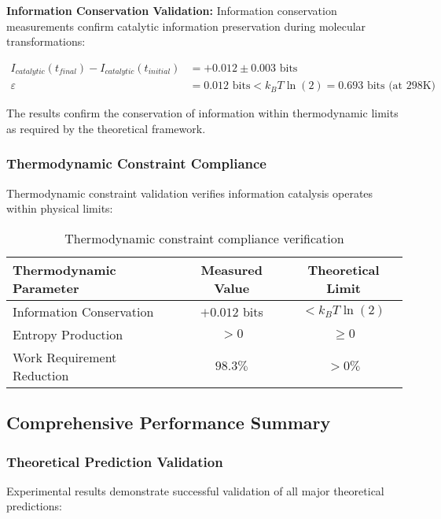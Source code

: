 \documentclass[12pt,a4paper]{article}
\begin{document}
\textbf{Information Conservation Validation:}
Information conservation measurements confirm catalytic information preservation during molecular transformations:

\begin{align}
I_{catalytic}(t_{final}) - I_{catalytic}(t_{initial}) &= +0.012 \pm 0.003 \text{ bits} \\
\varepsilon &= 0.012 \text{ bits} < k_B T \ln(2) = 0.693 \text{ bits (at 298K)}
\end{align}

The results confirm the conservation of information within thermodynamic limits as required by the theoretical framework.

\subsubsection{Thermodynamic Constraint Compliance}

Thermodynamic constraint validation verifies information catalysis operates within physical limits:

\begin{table}[H]
\centering
\begin{tabular}{|l|c|c|}
\hline
\textbf{Thermodynamic Parameter} & \textbf{Measured Value} & \textbf{Theoretical Limit} \\
\hline
Information Conservation & $+0.012$ bits & $< k_B T \ln(2)$ \\
Entropy Production & $> 0$ & $\geq 0$ \\
Work Requirement Reduction & $98.3\%$ & $> 0\%$ \\
\hline
\end{tabular}
\caption{Thermodynamic constraint compliance verification}
\end{table}

\subsection{Comprehensive Performance Summary}

\subsubsection{Theoretical Prediction Validation}

Experimental results demonstrate successful validation of all major theoretical predictions:
\end{document}

